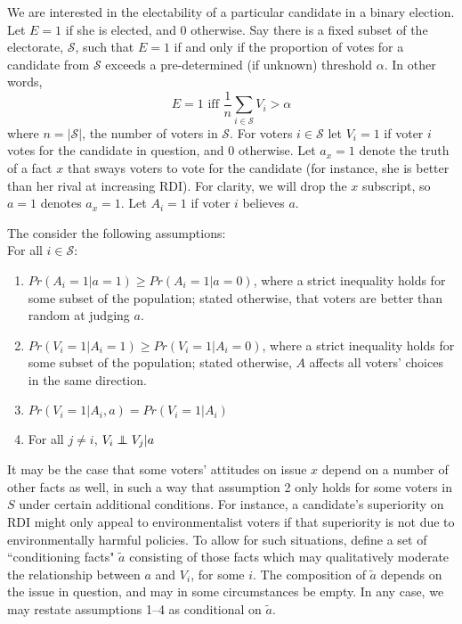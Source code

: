 \documentclass[11pt]{article}
\def\independenT#1#2{\mathrel{\rlap{$#1#2$}\mkern2mu{#1#2}}}
\newcommand\independent{\protect\mathpalette{\protect\independenT}{\perp}}
\begin{document}
We are interested in the electability of a particular candidate in a binary election. Let $E=1$ if she is elected, and 0 otherwise.
Say there is a fixed subset of the electorate, $\mathcal{S}$, such that $E=1$ if and only if the proportion of votes for a candidate from $\mathcal{S}$ exceeds a pre-determined (if unknown) threshold $\alpha$. In other words,
\begin{equation}
E =1 \text{ iff } \frac{1}{n} \sum_{i\in \mathcal{S}} V_i>\alpha
\end{equation}
where $n=|\mathcal{S}|$, the number of voters in $\mathcal{S}$. 
For voters $i\in \mathcal{S}$ let $V_i=1$ if voter $i$ votes for the candidate in question, and 0 otherwise.
Let $a_x=1$ denote the truth of a fact $x$ that sways voters to vote for the candidate (for instance, she is better than her rival at increasing RDI).
For clarity, we will drop the $x$ subscript, so $a=1$ denotes $a_x=1$.
Let $A_i=1$ if voter $i$ believes $a$.

The consider the following assumptions:\\
For all $i\in\mathcal{S}$:
\begin{enumerate}
\item $Pr(A_i=1|a=1)\ge Pr(A_i=1|a=0)$, where a strict inequality holds for some subset of the population; stated otherwise, that voters are better than random at judging $a$.
\item $Pr(V_i=1|A_i=1)\ge Pr(V_i=1|A_i=0)$, where a strict inequality holds for some subset of the population; stated otherwise, $A$ affects all voters' choices in the same direction.
\item $Pr(V_i=1|A_i, a)=Pr(V_i=1|A_i)$
\item For all $j\ne i$, $V_i \independent V_j|a$
\end{enumerate}

It may be the case that some voters' attitudes on issue $x$ depend on a number of other facts as well,  in such a way that assumption 2 only holds for some voters in $S$ under certain additional conditions.
For instance, a candidate's superiority on RDI might only appeal to environmentalist voters if that superiority is not due to environmentally harmful policies. 
To allow for such situations, define a set of ``conditioning facts" $\tilde{a}$ consisting of those facts which may qualitatively moderate the relationship between $a$ and $V_i$, for some $i$.
The composition of $\tilde{a}$ depends on the issue in question, and may in some circumstances be empty.
In any case, we may restate assumptions 1--4 as conditional on $\tilde{a}$.
\end{document}
